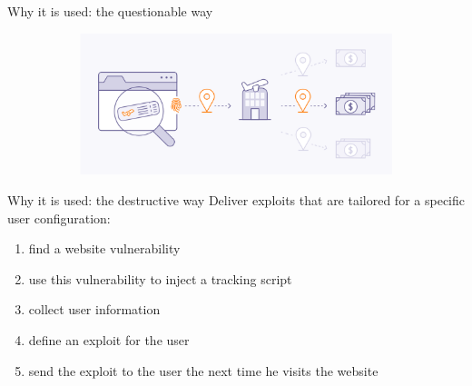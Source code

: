 \begin{frame}{Why it is used: the questionable way}
\begin{itemize}
\begin{figure}
\begin{subfigure}{0.45\textwidth}
            \end{subfigure}
            \begin{subfigure}{0.45\textwidth}
              \includegraphics[width=\linewidth]{images/flight.png}
            \end{subfigure}
          \end{figure}
  \end{itemize}
\end{frame}

\begin{frame}{Why it is used: the destructive way}
  Deliver exploits that are tailored for a specific user configuration:
  \vspace{0.5cm}
  \begin{enumerate}
    \item find a website vulnerability
          \vspace{0.5cm}
    \item use this vulnerability to inject a tracking script
          \vspace{0.5cm}
    \item collect user information
          \vspace{0.5cm}
    \item define an exploit for the user
          \vspace{0.5cm}
    \item send the exploit to the user the next time he visits the website
  \end{enumerate}
\end{frame}
